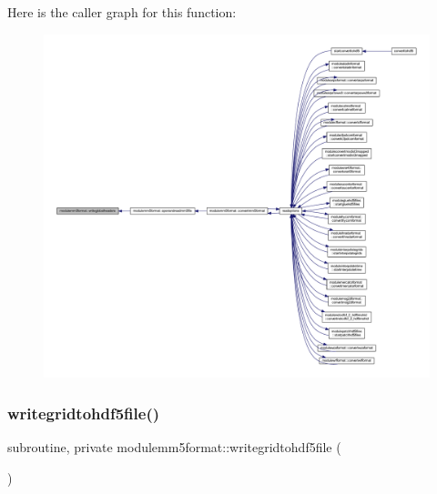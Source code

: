 Here is the caller graph for this function\+:\nopagebreak
\begin{figure}[H]
\begin{center}
\leavevmode
\includegraphics[width=350pt]{namespacemodulemm5format_a56429c53d699bf7bc1af81bd292f7d95_icgraph}
\end{center}
\end{figure}
\mbox{\label{namespacemodulemm5format_a752f2b2f864f9d5601283baf96f7397f}} 
\subsubsection{\texorpdfstring{writegridtohdf5file()}{writegridtohdf5file()}}
{\footnotesize\ttfamily subroutine, private modulemm5format\+::writegridtohdf5file (\begin{DoxyParamCaption}{ }\end{DoxyParamCaption})\hspace{0.3cm}{\ttfamily [private]}}

